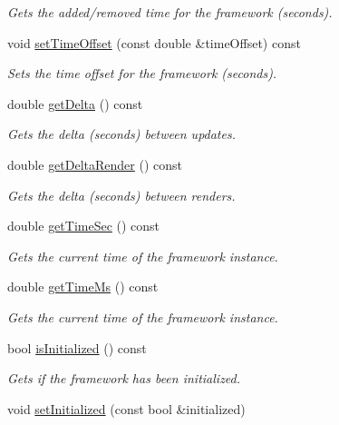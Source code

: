 \begin{DoxyCompactItemize}
\begin{DoxyCompactList}\small\item\em Gets the added/removed time for the framework (seconds). \end{DoxyCompactList}\item 
void \hyperlink{classflounder_1_1framework_aa4d08f34e622916ecd4a5f5f55bbac88}{set\+Time\+Offset} (const double \&time\+Offset) const
\begin{DoxyCompactList}\small\item\em Sets the time offset for the framework (seconds). \end{DoxyCompactList}\item 
double \hyperlink{classflounder_1_1framework_a46219c3eae921c9819e7228ec2d8d904}{get\+Delta} () const
\begin{DoxyCompactList}\small\item\em Gets the delta (seconds) between updates. \end{DoxyCompactList}\item 
double \hyperlink{classflounder_1_1framework_ae4020c8f9baeda03fe5ef8ceb6f1d286}{get\+Delta\+Render} () const
\begin{DoxyCompactList}\small\item\em Gets the delta (seconds) between renders. \end{DoxyCompactList}\item 
double \hyperlink{classflounder_1_1framework_acac765a2dd8e09267b7d6ce0620b8e55}{get\+Time\+Sec} () const
\begin{DoxyCompactList}\small\item\em Gets the current time of the framework instance. \end{DoxyCompactList}\item 
double \hyperlink{classflounder_1_1framework_a1f60ddf8e191eb9182b3e90007d8f9a1}{get\+Time\+Ms} () const
\begin{DoxyCompactList}\small\item\em Gets the current time of the framework instance. \end{DoxyCompactList}\item 
bool \hyperlink{classflounder_1_1framework_ad217b91b7e0f46f305105045396dcdf3}{is\+Initialized} () const
\begin{DoxyCompactList}\small\item\em Gets if the framework has been initialized. \end{DoxyCompactList}\item 
void \hyperlink{classflounder_1_1framework_a06963c9a669b09c6e33547a6766432df}{set\+Initialized} (const bool \&initialized)

\end{DoxyCompactItemize}
